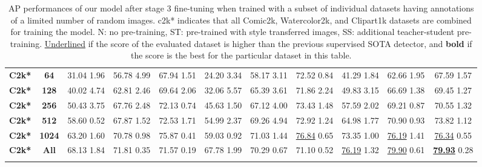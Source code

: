 \documentclass{article}
\begin{document}
\begin{table*}
\begin{tabular}{l|c|ccc|ccc|ccc}
\textbf{C2k*} & \textbf{64}   
    & 31.04 {\tiny 1.96} & 56.78 {\tiny 4.99} & 67.94 {\tiny 1.51} 
    & 24.20 {\tiny 3.34} & 58.17 {\tiny 3.11} & 72.52 {\tiny 0.84} 
    & 41.29 {\tiny 1.84} & 62.66 {\tiny 1.95} & 67.59 {\tiny 1.57} \\
    \textbf{C2k*} & \textbf{128}
    & 40.02 {\tiny 4.74} & 62.81 {\tiny 2.46} & 69.64 {\tiny 2.06} 
    & 32.06 {\tiny 5.57} & 65.39 {\tiny 3.61} & 71.86 {\tiny 2.24} 
    & 49.83 {\tiny 3.15} & 66.69 {\tiny 1.38} & 69.45 {\tiny 1.27} \\
    \textbf{C2k*} & \textbf{256}   
    & 50.43 {\tiny 3.75} & 67.76 {\tiny 2.48} & 72.13 {\tiny 0.74} 
    & 45.63 {\tiny 1.50} & 67.12 {\tiny 4.00} & 73.43 {\tiny 1.48} 
    & 57.59 {\tiny 2.02} & 69.21 {\tiny 0.87} & 70.55 {\tiny 1.32} \\
    \textbf{C2k*} & \textbf{512}   
    & 58.60 {\tiny 0.52} & 67.87 {\tiny 1.52} & 72.53 {\tiny 1.71} 
    & 54.99 {\tiny 2.37} & 69.26 {\tiny 4.94} & 72.92 {\tiny 1.24} 
    & 64.98 {\tiny 1.77} & 70.90 {\tiny 0.93} & 73.82 {\tiny 1.12} \\
    \textbf{C2k*} & \textbf{1024}   
    & 63.20 {\tiny 1.60} & 70.78 {\tiny 0.98} & 75.87 {\tiny 0.41} 
    & 59.03 {\tiny 0.92} & 71.03 {\tiny 1.44} & \underline{76.84} {\tiny 0.65} 
    & 73.35 {\tiny 1.00} & \underline{76.19} {\tiny 1.41} & \underline{76.34} {\tiny 0.55} \\
    
    \textbf{C2k*} & \textbf{All}
    & 68.13 {\tiny 1.84} & 71.81 {\tiny 0.35} & 71.57 {\tiny 0.19}	
    & 67.78 {\tiny 1.99} & 70.29 {\tiny 0.67} & 71.10 {\tiny 0.52}
    & \underline{76.19} {\tiny 1.32} & \underline{79.90} {\tiny 0.61} & \underline{\textbf{79.93}} {\tiny 0.28} \\

    \noalign{\smallskip}
    \hline
\end{tabular}
\caption{AP performances of our model after stage 3 fine-tuning when trained with a subset of individual datasets having annotations of a limited number of random images. c2k* indicates that all Comic2k, Watercolor2k, and Clipart1k datasets are combined for training the model. N: no pre-training, ST: pre-trained with style transferred images, SS: additional teacher-student pre-training. \underline{Underlined} if the score of the evaluated dataset is higher than the previous supervised SOTA detector, and \textbf{bold} if the score is the best for the particular dataset in this table.}
\label{table:sup_stage_3_results}
\end{table*} 
\end{document}
